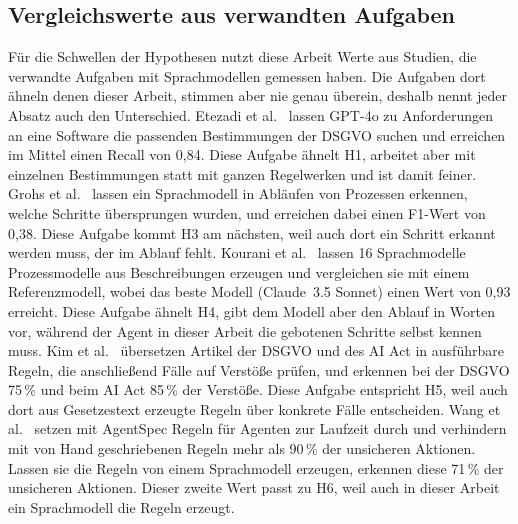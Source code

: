 \subsection{Vergleichswerte aus verwandten Aufgaben}\label{sec:vergleichswerte}
Für die Schwellen der Hypothesen nutzt diese Arbeit Werte aus Studien, die verwandte Aufgaben mit Sprachmodellen gemessen haben.
Die Aufgaben dort ähneln denen dieser Arbeit, stimmen aber nie genau überein, deshalb nennt jeder Absatz auch den Unterschied.
Etezadi et al.~\cite{etezadi2025} lassen GPT-4o zu Anforderungen an eine Software die passenden Bestimmungen der DSGVO suchen und erreichen im Mittel einen Recall von 0,84.
Diese Aufgabe ähnelt H1, arbeitet aber mit einzelnen Bestimmungen statt mit ganzen Regelwerken und ist damit feiner.
Grohs et al.~\cite{grohs2025} lassen ein Sprachmodell in Abläufen von Prozessen erkennen, welche Schritte übersprungen wurden, und erreichen dabei einen F1-Wert von 0,38.
Diese Aufgabe kommt H3 am nächsten, weil auch dort ein Schritt erkannt werden muss, der im Ablauf fehlt.
Kourani et al.~\cite{kourani2024} lassen 16 Sprachmodelle Prozessmodelle aus Beschreibungen erzeugen und vergleichen sie mit einem Referenzmodell, wobei das beste Modell (Claude~3.5 Sonnet) einen Wert von 0,93 erreicht.
Diese Aufgabe ähnelt H4, gibt dem Modell aber den Ablauf in Worten vor, während der Agent in dieser Arbeit die gebotenen Schritte selbst kennen muss.
Kim et al.~\cite{kim2026} übersetzen Artikel der DSGVO und des AI Act in ausführbare Regeln, die anschließend Fälle auf Verstöße prüfen, und erkennen bei der DSGVO 75\,\% und beim AI Act 85\,\% der Verstöße.
Diese Aufgabe entspricht H5, weil auch dort aus Gesetzestext erzeugte Regeln über konkrete Fälle entscheiden.
Wang et al.~\cite{wang2026agentspec} setzen mit AgentSpec Regeln für Agenten zur Laufzeit durch und verhindern mit von Hand geschriebenen Regeln mehr als 90\,\% der unsicheren Aktionen.
Lassen sie die Regeln von einem Sprachmodell erzeugen, erkennen diese 71\,\% der unsicheren Aktionen.
Dieser zweite Wert passt zu H6, weil auch in dieser Arbeit ein Sprachmodell die Regeln erzeugt.

